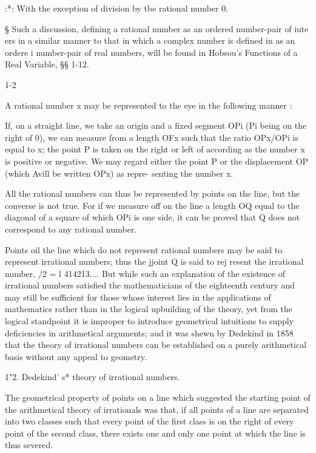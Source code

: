 :*: With the exception of division by tbe rational number 0.

§ Such a discussion, defining a rational number as an ordered
number-pair of iute ers in a similar manner to that in which a complex
number is defined in as an ordere i number-pair of real numbers,
will be found in Hobsou's Functions of a Real Variable, §§ 1-12.

1-2

%
%

A rational number x may be represented to the eye in the following
manner :

If, on a straight line, we take an origin and a fixed segment OPi (Pi
being on the right of 0), we can measure from a length OFx such that
the ratio OPx/OPi is equal to x; the point P is taken on the right or
left of according as the number x is positive or negative. We may
regard either the point P or the displacement OP (which Avill be
written OPx) as repre- senting the number x.

All the rational numbers can thus be represented by points on the
line, but the converse is not true. For if we measure off on the line
a length OQ equal to the diagonal of a square of which OPi is one
side, it can be proved that Q does not correspond to any rational
number.

Points oil the line which do not represent rational numbers may be
said to represent irrational numbers; thus the jjoint Q is said to
rej resent the irrational number, /2 = l 414213.... But while such
an explanation of the existence of irrational numbers satisfied the
mathematicians of the eighteenth century and may still be sufficient
for those whose interest lies in the applications of mathematics
rather than in the logical upbuilding of the theory, yet from the
logical standpoint it is improper to introduce geometrical intuitions
to supply deficiencies in arithmetical arguments; aud it was shewn by
Dedekind in 1858 that the theory of irrational numbers can be
established on a purely arithmetical basis without any appeal to
geometry.

1"2. Dedekind' s* theory of irrational numbers.

The geometrical property of points on a line which suggested the
starting point of the arithmetical theory of irrationals was that, if
all points of a line are separated into two classes such that every
point of the first class is on the right of every point of the second
class, there exists one and only one point at which the line is thus
severed.

